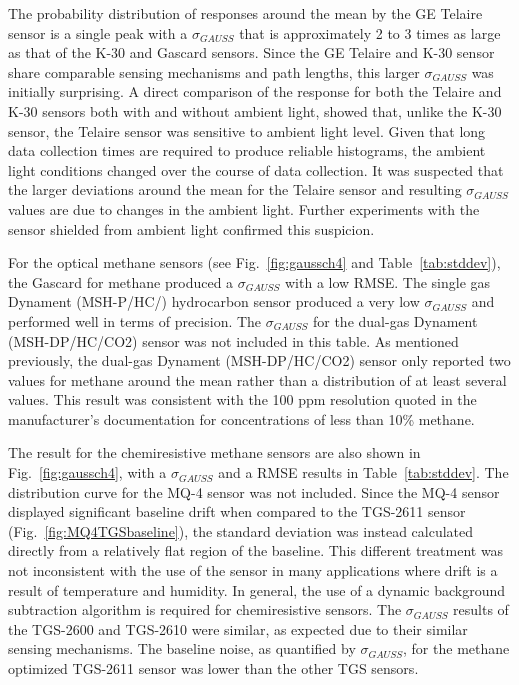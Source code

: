 \documentclass[preprint,sort&compress]{elsarticle}
\begin{document}
			
			The probability distribution of responses around the mean by the GE Telaire sensor is a single peak with a $\sigma_{GAUSS}$ that is approximately 2 to 3 times as large as that of the K-30 and Gascard sensors.
			Since the GE Telaire and K-30 sensor share comparable sensing mechanisms and path lengths, this larger $\sigma_{GAUSS}$ was initially surprising.
			A direct comparison of the response for both the Telaire and K-30 sensors both with and without ambient light, showed that, unlike the K-30 sensor, the Telaire sensor was sensitive to ambient light level.
			Given that long data collection times are required to produce reliable histograms, the ambient light conditions changed over the course of data collection.
			It was suspected that the larger deviations around the mean for the Telaire sensor and resulting $\sigma_{GAUSS}$ values are due to changes in the ambient light.
			Further experiments with the sensor shielded from ambient light confirmed this suspicion.
			
			
			For the optical methane sensors (see Fig.~\ref{fig:gaussch4} and Table~\ref{tab:stddev}), the Gascard for methane produced a $\sigma_{GAUSS}$ with a low RMSE. The single gas Dynament (MSH-P/HC/) hydrocarbon sensor produced a very low $\sigma_{GAUSS}$ and performed well in terms of precision.
			The $\sigma_{GAUSS}$ for the dual-gas Dynament (MSH-DP/HC/CO2) sensor was not included in this table.
			As mentioned previously, the dual-gas Dynament (MSH-DP/HC/CO2) sensor only reported two values for methane around the mean rather than a distribution of at least several values.
			This result was consistent with the 100 ppm resolution quoted in the manufacturer's documentation for concentrations of less than 10\% methane.
			

			The result for the chemiresistive methane sensors are also shown in Fig.~\ref{fig:gaussch4}, with a $\sigma_{GAUSS}$ and a RMSE results in Table~\ref{tab:stddev}.
			The distribution curve for the MQ-4 sensor was not included.
			Since the MQ-4 sensor displayed significant baseline drift when compared to the TGS-2611 sensor (Fig.~\ref{fig:MQ4TGSbaseline}), the standard deviation was instead calculated directly from a relatively flat region of the baseline.
			This different treatment was not inconsistent with the use of the sensor in many applications where drift is a result of temperature and humidity.
			 In general, the use of a dynamic background subtraction algorithm is required for chemiresistive sensors.
			The $\sigma_{GAUSS}$ results of the TGS-2600 and TGS-2610 were similar, as expected due to their similar sensing mechanisms.
			The baseline noise, as quantified by $\sigma_{GAUSS}$, for the methane optimized TGS-2611 sensor was lower than the other TGS sensors.
			
\end{document}
